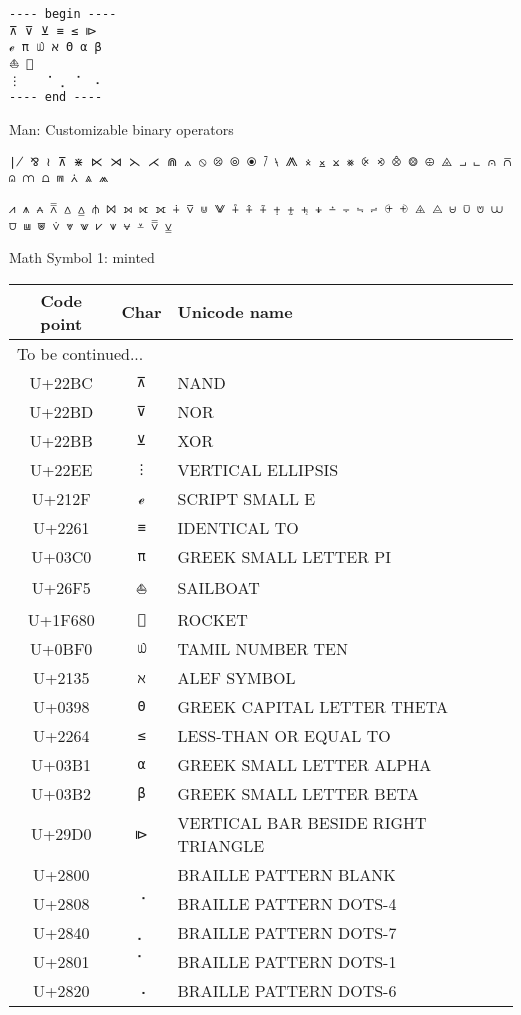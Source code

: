 \documentclass[a4paper]{article}
\begin{document}
\begin{verbatim}
---- begin ----
⊼ ⊽ ⊻ ≡ ≤ ⧐
ℯ π ௰ ℵ Θ α β
⛵ 🚀
⋮ ⠀ ⠈ ⡀ ⠁ ⠠
---- end ----
\end{verbatim}

Man: Customizable binary operators

\texttt{∤ ⅋ ≀ ⊼ ⋇ ⋉ ⋊ ⋋ ⋌ ⋒ ⟑ ⦸ ⦼ ⦾ ⦿ ⧶ ⧷ ⨇ ⨰ ⨱ ⨲ ⨳ ⨴ ⨵ ⨶ ⨷ ⨸ ⨻ ⨼ ⨽ ⩀ ⩃ ⩄ ⩋ ⩍ ⩎ ⩑ ⩓ ⩕ } 

\texttt{⩘ ⩚ ⩜ ⩞ ⩟ ⩠ ⫛ ⨝ ⟕ ⟖ ⟗ ∔ ⊽ ⋓ ⨈ ⨢ ⨣ ⨤ ⨥ ⨦ ⨧ ⨨ ⨩ ⨪ ⨫ ⨬ ⨭ ⨮ ⨹ ⨺ ⩁ ⩂ ⩅ ⩊ ⩌ ⩏ ⩐ ⩒ ⩔ ⩖ ⩗ ⩛ ⩝ ⩡ ⩢ ⩣ }



{\Large Math Symbol 1: minted}

\begin{longtable}{ccl}
  \toprule
  Code point & Char & Unicode name \\
  \hline \endhead
  \multicolumn{3}{l}{To be continued...} \\ 
  \midrule \endfoot
  \bottomrule \endlastfoot

  U+22BC & \texttt{⊼}  & NAND \\ \hline
  U+22BD & \texttt{⊽}  & NOR \\ \hline
  U+22BB & \texttt{⊻}  & XOR \\ \hline
  U+22EE & \texttt{⋮}  & VERTICAL ELLIPSIS \\ \hline
  U+212F & \texttt{ℯ}  & SCRIPT SMALL E \\ \hline
  U+2261 & \texttt{≡}  & IDENTICAL TO \\ \hline
  U+03C0 & \texttt{π}  & GREEK SMALL LETTER PI \\ \hline
  U+26F5 & \texttt{⛵}  & SAILBOAT \\ \hline
  U+1F680 & \texttt{🚀}  & ROCKET \\ \hline
  U+0BF0 & \texttt{௰}  & TAMIL NUMBER TEN \\ \hline
  U+2135 & \texttt{ℵ}  & ALEF SYMBOL \\ \hline
  U+0398 & \texttt{Θ}  & GREEK CAPITAL LETTER THETA \\ \hline
  U+2264 & \texttt{≤}  & LESS-THAN OR EQUAL TO \\ \hline
  U+03B1 & \texttt{α}  & GREEK SMALL LETTER ALPHA \\ \hline
  U+03B2 & \texttt{β}  & GREEK SMALL LETTER BETA \\ \hline
  U+29D0 & \texttt{⧐}  & VERTICAL BAR BESIDE RIGHT TRIANGLE \\ \hline
  U+2800 & \texttt{⠀}  & BRAILLE PATTERN BLANK \\ \hline
  U+2808 & \texttt{⠈}  & BRAILLE PATTERN DOTS-4 \\ \hline
  U+2840 & \texttt{⡀}  & BRAILLE PATTERN DOTS-7 \\ \hline
  U+2801 & \texttt{⠁}  & BRAILLE PATTERN DOTS-1 \\ \hline
  U+2820 & \texttt{⠠}  & BRAILLE PATTERN DOTS-6 \\ \hline

  \bottomrule
\end{longtable}
\end{document}
